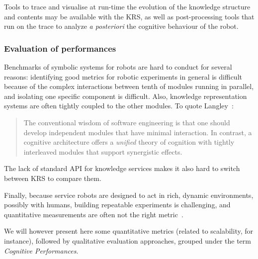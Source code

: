 Tools to trace and visualise at run-time the evolution of the knowledge
structure and contents may be available with the KRS, as well as
post-processing tools that run on the trace to analyze {\it a posteriori} the
cognitive behaviour of the robot.

\subsubsection{Evaluation of performances}
\label{sect|performances}

Benchmarks of symbolic systems for robots are hard to conduct for several
reasons: identifying good metrics for robotic experiments in general is
difficult because of the complex interactions between tenth of modules running
in parallel, and isolating one specific component is difficult.  Also,
knowledge representation systems are often tightly coupled to the other
modules. To quote Langley~\cite{Langley2006}:

\begin{quote}
The conventional wisdom of software engineering is that one should
develop independent modules that have minimal interaction. In contrast, a
cognitive architecture offers a \emph{unified} theory of cognition with tightly
interleaved modules that support synergistic effects.
\end{quote}

The lack of standard API for knowledge services makes it also hard to switch
between KRS to compare them.

Finally, because service robots are designed to act in rich, dynamic
environments, possibly with humans, building repeatable experiments is
challenging, and quantitative measurements are often not the right
metric~\cite{Langley2006}.

We will however present here some quantitative metrics (related to scalability,
for instance), followed by qualitative evaluation approaches, grouped under the
term \emph{Cognitive Performances}.

\begin{scriptsize}
\begin{center}
\end{center}
\end{scriptsize}


